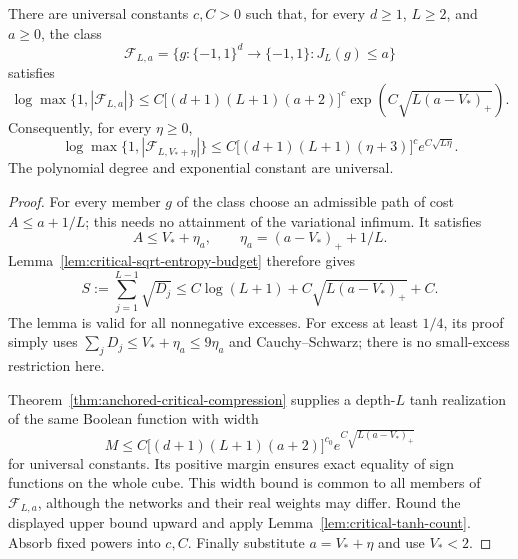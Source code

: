 \begin{theorem}
\label{thm:critical-rate-sublevel-capacity}
There are universal constants $c,C>0$ such that, for every $d\ge1$,
$L\ge2$, and $a\ge0$, the class
\[
 \mathcal F_{L,a}=\{g:\{-1,1\}^d\to\{-1,1\}:J_L(g)\le a\}
\]
satisfies
\begin{equation}\label{eq:critical-sublevel-cardinality}
 \log\max\{1,|\mathcal F_{L,a}|\}
 \le C\bigl[(d+1)(L+1)(a+2)\bigr]^c
       \exp\!\left(C\sqrt{L(a-V_*)_+}\right).
\end{equation}
Consequently, for every $\eta\ge0$,
\begin{equation}\label{eq:critical-sublevel-excess-cardinality}
 \log\max\{1,|\mathcal F_{L,V_*+\eta}|\}
 \le C\bigl[(d+1)(L+1)(\eta+3)\bigr]^c
       e^{C\sqrt{L\eta}}.
\end{equation}
The polynomial degree and exponential constant are universal.
\end{theorem}

\begin{proof}
For every member $g$ of the class choose an admissible path of cost
$A\le a+1/L$; this needs no attainment of the variational infimum.
It satisfies
\[
 A\le V_*+\eta_a,\qquad
 \eta_a=(a-V_*)_++1/L.
\]
Lemma~\ref{lem:critical-sqrt-entropy-budget} therefore gives
\[
 S:=\sum_{j=1}^{L-1}\sqrt{D_j}
 \le C\log(L+1)+C\sqrt{L(a-V_*)_+}+C.
\]
The lemma is valid for all nonnegative excesses. For excess at least
$1/4$, its proof simply uses
$\sum_jD_j\le V_*+\eta_a\le9\eta_a$ and Cauchy--Schwarz;
there is no small-excess restriction here.

Theorem~\ref{thm:anchored-critical-compression} supplies a depth-$L$
tanh realization of the same Boolean function with width
\[
 M\le C\bigl[(d+1)(L+1)(a+2)\bigr]^{c_0}
          e^{C\sqrt{L(a-V_*)_+}}
\]
for universal constants. Its positive margin ensures exact equality
of sign functions on the whole cube. This width bound is common to
all members of $\mathcal F_{L,a}$, although the networks and their
real weights may differ. Round the displayed upper bound upward and
apply Lemma~\ref{lem:critical-tanh-count}. Absorb fixed powers into
$c,C$. Finally substitute $a=V_*+\eta$ and use $V_*<2$.
\end{proof}

